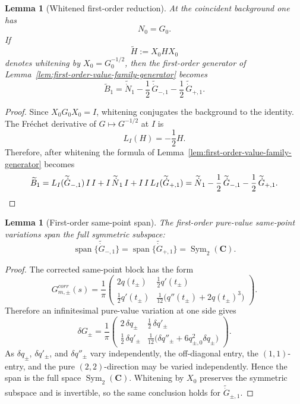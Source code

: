 \documentclass[11pt,a4paper]{amsart}
\def\corr{corr}%
\theoremstyle{plain}
\newtheorem{lemma}[theorem]{Lemma}
\theoremstyle{definition}
\newcommand{\corr}{\mathrm{corr}}
\begin{document}
\begin{lemma}[Whitened first-order reduction]
\label{lem:first-order-generator-whitened}
At the coincident background one has
\[
N_0=G_0.
\]
If
\[
\widetilde H:=X_0HX_0
\]
denotes whitening by $X_0=G_0^{-1/2}$, then the first-order generator of
Lemma~\ref{lem:first-order-value-family-generator} becomes
\[
\widetilde B_1
=
\widetilde{\dot N}_1
-\frac12\,\widetilde{\dot G}_{-,1}
-\frac12\,\widetilde{\dot G}_{+,1}.
\]
\end{lemma}

\begin{proof}
Since $X_0G_0X_0=I$, whitening conjugates the background to the identity.
The Fr\'echet derivative of $G\mapsto G^{-1/2}$ at $I$ is
\[
L_I(H)=-\frac12 H.
\]
Therefore, after whitening the formula of
Lemma~\ref{lem:first-order-value-family-generator} becomes
\[
\widetilde B_1
=
L_I(\widetilde{\dot G}_{-,1})\,I\,I
+
I\,\widetilde{\dot N}_1\,I
+
I\,I\,L_I(\widetilde{\dot G}_{+,1})
=
\widetilde{\dot N}_1
-\frac12\,\widetilde{\dot G}_{-,1}
-\frac12\,\widetilde{\dot G}_{+,1}.
\qedhere
\]
\end{proof}

\begin{lemma}[First-order same-point span]
\label{lem:first-order-same-point-span}
The first-order pure-value same-point variations span the full symmetric
subspace:
\[
\operatorname{span}\{\widetilde{\dot G}_{-,1}\}
=
\operatorname{span}\{\widetilde{\dot G}_{+,1}\}
=
\operatorname{Sym}_2(\mathbf C).
\]
\end{lemma}

\begin{proof}
The corrected same-point block has the form
\[
G_{m,\pm}^{\corr}(s)
=
\frac1\pi
\begin{pmatrix}
2q(t_\pm) & \frac12 q'(t_\pm)\\[.5ex]
\frac12 q'(t_\pm) & \frac1{12}\bigl(q''(t_\pm)+2q(t_\pm)^3\bigr)
\end{pmatrix}.
\]
Therefore an infinitesimal pure-value variation at one side gives
\[
\delta G_\pm
=
\frac1\pi
\begin{pmatrix}
2\,\delta q_\pm & \frac12\,\delta q'_\pm\\[.5ex]
\frac12\,\delta q'_\pm &
\frac1{12}\bigl(\delta q''_\pm+6q_{\pm,0}^2\delta q_\pm\bigr)
\end{pmatrix}.
\]
As $\delta q_\pm$, $\delta q'_\pm$, and $\delta q''_\pm$ vary
independently, the off-diagonal entry, the $(1,1)$-entry, and the pure
$(2,2)$-direction may be varied independently. Hence the span is the full
space $\operatorname{Sym}_2(\mathbf C)$. Whitening by $X_0$ preserves the
symmetric subspace and is invertible, so the same conclusion holds for
$\widetilde{\dot G}_{\pm,1}$.
\end{proof}
\end{document}
